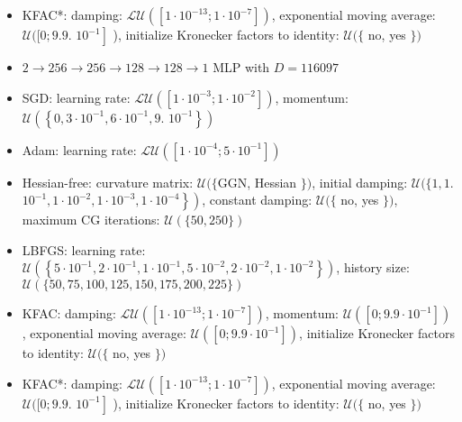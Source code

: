 \documentclass[10pt]{article}
\begin{document}
\begin{itemize}
  \item KFAC*: damping: $\mathcal{L U}\left(\left[1 \cdot 10^{-13} ; 1 \cdot 10^{-7}\right]\right)$, exponential moving average: $\mathcal{U}([0 ; 9.9$. $\left.10^{-1}\right]$ ), initialize Kronecker factors to identity: $\mathcal{U}(\{$ no, yes $\})$
  \item $2 \rightarrow 256 \rightarrow 256 \rightarrow 128 \rightarrow 128 \rightarrow 1$ MLP with $D=116097$
  \item SGD: learning rate: $\mathcal{L U}\left(\left[1 \cdot 10^{-3} ; 1 \cdot 10^{-2}\right]\right)$, momentum: $\mathcal{U}\left(\left\{0,3 \cdot 10^{-1}, 6 \cdot 10^{-1}, 9\right.\right.$. $\left.\left.10^{-1}\right\}\right)$
  \item Adam: learning rate: $\mathcal{L U}\left(\left[1 \cdot 10^{-4} ; 5 \cdot 10^{-1}\right]\right)$
  \item Hessian-free: curvature matrix: $\mathcal{U}(\{\mathrm{GGN}$, Hessian $\})$, initial damping: $\mathcal{U}(\{1,1$. $\left.\left.10^{-1}, 1 \cdot 10^{-2}, 1 \cdot 10^{-3}, 1 \cdot 10^{-4}\right\}\right)$, constant damping: $\mathcal{U}(\{$ no, yes $\})$, maximum CG iterations: $\mathcal{U}(\{50,250\})$
  \item LBFGS: learning rate: $\mathcal{U}\left(\left\{5 \cdot 10^{-1}, 2 \cdot 10^{-1}, 1 \cdot 10^{-1}, 5 \cdot 10^{-2}, 2 \cdot 10^{-2}, 1 \cdot 10^{-2}\right\}\right)$, history size: $\mathcal{U}(\{50,75,100,125,150,175,200,225\})$
  \item KFAC: damping: $\mathcal{L U}\left(\left[1 \cdot 10^{-13} ; 1 \cdot 10^{-7}\right]\right)$, momentum: $\mathcal{U}\left(\left[0 ; 9.9 \cdot 10^{-1}\right]\right)$, exponential moving average: $\mathcal{U}\left(\left[0 ; 9.9 \cdot 10^{-1}\right]\right)$, initialize Kronecker factors to identity: $\mathcal{U}(\{$ no, yes $\})$
  \item KFAC*: damping: $\mathcal{L U}\left(\left[1 \cdot 10^{-13} ; 1 \cdot 10^{-7}\right]\right)$, exponential moving average: $\mathcal{U}([0 ; 9.9$. $\left.10^{-1}\right]$ ), initialize Kronecker factors to identity: $\mathcal{U}(\{$ no, yes $\})$
\end{itemize}
\end{document}
